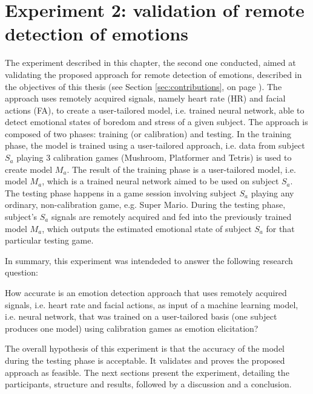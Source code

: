\chapter{Experiment 2: validation of remote detection of emotions}
\label{ch:experiment2}

The experiment described in this chapter, the second one conducted, aimed at validating the proposed approach for remote detection of emotions, described in the objectives of this thesis (see Section \ref{sec:contributions}, on page \pageref{sec:contributions}). The approach uses remotely acquired signals, namely heart rate (HR) and facial actions (FA), to create a user-tailored model, i.e. trained neural network, able to detect emotional states of boredom and stress of a given subject. The approach is composed of two phases: training (or calibration) and testing. In the training phase, the model is trained using a user-tailored approach, i.e. data from subject $S_a$ playing 3 calibration games (Mushroom, Platformer and Tetris) is used to create model $M_a$. The result of the training phase is a user-tailored model, i.e. model $M_a$, which is a trained neural network aimed to be used on subject $S_a$. The testing phase happens in a game session involving subject $S_a$ playing any ordinary, non-calibration game, e.g. Super Mario. During the testing phase, subject's $S_a$ signals are remotely acquired and fed into the previously trained model $M_a$, which outputs the estimated emotional state of subject $S_a$ for that particular testing game.

In summary, this experiment was intendeded to answer the following research question:

\begin{fquote}
How accurate is an emotion detection approach that uses remotely acquired signals, i.e. heart rate and facial actions, as input of a machine learning model, i.e. neural network, that was trained on a user-tailored basis (one subject produces one model) using calibration games as emotion elicitation?
\end{fquote}

The overall hypothesis of this experiment is that the accuracy of the model during the testing phase is acceptable. It validates and proves the proposed approach as feasible. The next sections present the experiment, detailing the participants, structure and results, followed by a discussion and a conclusion.

